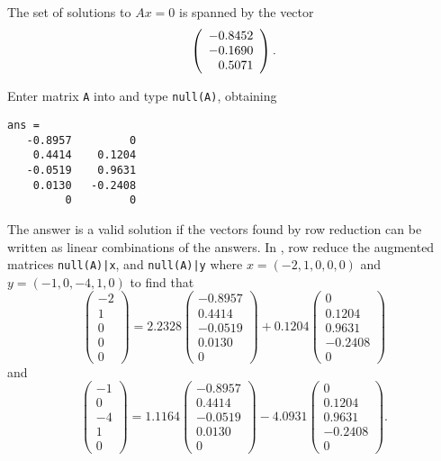  The set of solutions to $Ax = 0$ is spanned by the vector
\[
\left(\begin{array}{r} -0.8452 \\ -0.1690 \\ 0.5071\end{array}\right).
\]

\newpage
{}
Enter matrix {\tt A} into \Matlab and type {\tt null(A)}, obtaining
\begin{verbatim}
ans =
   -0.8957         0
    0.4414    0.1204
   -0.0519    0.9631
    0.0130   -0.2408
         0         0
\end{verbatim}
The \Matlab answer is a valid solution if the vectors found
by row reduction can be written as linear combinations of the \Matlab
answers.  In \Matlab, row reduce the augmented matrices {\tt null(A)|x},
and {\tt null(A)|y} where $x = (-2,1,0,0,0)$ and $y = (-1,0,-4,1,0)$ 
to find that
\[
\left(\begin{array}{r} -2 \\ 1 \\ 0 \\ 0 \\ 0 \end{array}\right) =
2.2328\left(\begin{array}{r} -0.8957 \\ 0.4414 \\ -0.0519 \\ 0.0130 \\ 0
\end{array}\right) + 0.1204\left(\begin{array}{r} 0 \\ 0.1204 \\ 0.9631 \\
-0.2408 \\ 0 \end{array}\right)
\]
and
\[
\left(\begin{array}{r} -1 \\ 0 \\ -4 \\ 1 \\ 0 \end{array}\right) =
1.1164\left(\begin{array}{r} -0.8957 \\ 0.4414 \\ -0.0519 \\ 0.0130 \\ 0
\end{array}\right) - 4.0931\left(\begin{array}{r} 0 \\ 0.1204 \\ 0.9631 \\
-0.2408 \\ 0 \end{array}\right).
\]

